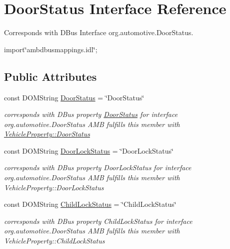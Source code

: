 \hypertarget{interfaceDoorStatus}{\section{Door\+Status Interface Reference}
\label{interfaceDoorStatus}
}


Corresponds with D\+Bus Interface org.\+automotive.\+Door\+Status.  




{\ttfamily import\char`\"{}ambdbusmappings.\+idl\char`\"{};}

\subsection*{Public Attributes}
\begin{DoxyCompactItemize}
\item 
\hypertarget{interfaceDoorStatus_ab8977ee56597373293c07dd5afac475d}{const D\+O\+M\+String \hyperlink{interfaceDoorStatus_ab8977ee56597373293c07dd5afac475d}{Door\+Status} = \char`\"{}Door\+Status\char`\"{}}\label{interfaceDoorStatus_ab8977ee56597373293c07dd5afac475d}

\begin{DoxyCompactList}\small\item\em corresponds with D\+Bus property \hyperlink{interfaceDoorStatus}{Door\+Status} for interface org.\+automotive.\+Door\+Status A\+M\+B fulfills this member with \hyperlink{classVehicleProperty_aec1cd341d1eda388b27e5e2c167f377b}{Vehicle\+Property\+::\+Door\+Status} \end{DoxyCompactList}\item 
\hypertarget{interfaceDoorStatus_a247ed5ad35c7921041979a3720e54189}{const D\+O\+M\+String \hyperlink{interfaceDoorStatus_a247ed5ad35c7921041979a3720e54189}{Door\+Lock\+Status} = \char`\"{}Door\+Lock\+Status\char`\"{}}\label{interfaceDoorStatus_a247ed5ad35c7921041979a3720e54189}

\begin{DoxyCompactList}\small\item\em corresponds with D\+Bus property Door\+Lock\+Status for interface org.\+automotive.\+Door\+Status A\+M\+B fulfills this member with Vehicle\+Property\+::\+Door\+Lock\+Status \end{DoxyCompactList}\item 
\hypertarget{interfaceDoorStatus_a1f26de9c8b47568fc38fc219db74883b}{const D\+O\+M\+String \hyperlink{interfaceDoorStatus_a1f26de9c8b47568fc38fc219db74883b}{Child\+Lock\+Status} = \char`\"{}Child\+Lock\+Status\char`\"{}}\label{interfaceDoorStatus_a1f26de9c8b47568fc38fc219db74883b}

\begin{DoxyCompactList}\small\item\em corresponds with D\+Bus property Child\+Lock\+Status for interface org.\+automotive.\+Door\+Status A\+M\+B fulfills this member with Vehicle\+Property\+::\+Child\+Lock\+Status \end{DoxyCompactList}\end{DoxyCompactItemize}



